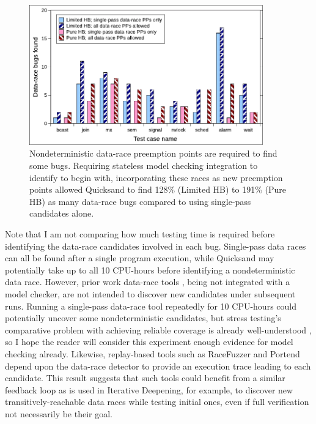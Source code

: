 \begin{figure}[t]
	\begin{center}
	\includegraphics[width=0.9\textwidth]{../proposal/nondets.pdf} %
	\end{center}
	\caption[Nondeterministic data-race preemption points are required to find some bugs.]
	{Nondeterministic data-race preemption points are required to find some bugs.
	Requiring stateless model checking integration to identify to begin with,
	incorporating these races as new preemption points
	allowed Quicksand to find
	128\% (Limited HB) to 191\% (Pure HB) as many data-race bugs
	compared to using single-pass candidates alone.
	}
	\label{fig:dr-falsenegs}
\end{figure}

Note that I am not comparing how much testing time is required before identifying the data-race candidates involved in each bug.
Single-pass data races can all be found after a single program execution,
while Quicksand may potentially take up to all 10 CPU-hours before identifying a nondeterministic data race.
However, prior work data-race tools \cite{tsan,fasttrack},
being not integrated with a model checker,
are not intended to discover new candidates under subsequent runs.
Running a single-pass data-race tool repeatedly for 10 CPU-hours could potentially uncover some nondeterministic candidates,
but stress testing's comparative problem with achieving reliable coverage is already well-understood
\cite{chess-icb,gambit},
so I hope the reader will consider this experiment enough evidence for model checking already.
Likewise, replay-based tools such as RaceFuzzer \cite{racefuzzer} and Portend \cite{portend}
depend upon the data-race detector to provide an execution trace leading to each candidate.
This result suggests that
such tools could benefit from a similar feedback loop as is used in Iterative Deepening,
for example, to discover new transitively-reachable data races while testing initial ones,
even if full verification not necessarily be their goal.

